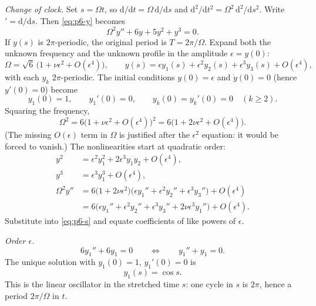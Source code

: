 \documentclass[11pt,a4paper]{article}
\begin{document}
\emph{Change of clock.}
Set \(s=\Omega t\), so \(\mathrm{d}/\mathrm{d}t=\Omega\,\mathrm{d}/\mathrm{d}s\) and \(\mathrm{d}^{2}/\mathrm{d}t^{2}=\Omega^{2}\,\mathrm{d}^{2}/\mathrm{d}s^{2}\). Write \('=\mathrm{d}/\mathrm{d}s\). Then \eqref{eq:p6-y} becomes
\begin{equation}
\label{eq:p6-s}
\Omega^{2} y''+6y+5y^{2}+y^{3}=0.
\end{equation}
If \(y(s)\) is \(2\pi\)-periodic, the original period is \(T=2\pi/\Omega\). Expand both the unknown frequency and the unknown profile in the amplitude \(\epsilon=y(0)\):
\begin{equation}
\label{eq:p6-ansatz}
\Omega=\sqrt{6}\,\bigl(1+\nu\epsilon^{2}+O(\epsilon^{4})\bigr),
\qquad
y(s)=\epsilon y_{1}(s)+\epsilon^{2} y_{2}(s)+\epsilon^{3} y_{3}(s)+O(\epsilon^{4}),
\end{equation}
with each \(y_{k}\) \(2\pi\)-periodic. The initial conditions \(y(0)=\epsilon\) and \(\dot y(0)=0\) (hence \(y'(0)=0\)) become
\[
y_{1}(0)=1,\qquad y_{1}'(0)=0,
\qquad
y_{k}(0)=y_{k}'(0)=0\quad(k\ge 2).
\]
Squaring the frequency,
\[
\Omega^{2}
=
6\bigl(1+\nu\epsilon^{2}+O(\epsilon^{4})\bigr)^{2}
=
6\bigl(1+2\nu\epsilon^{2}+O(\epsilon^{4})\bigr).
\]
(The missing \(O(\epsilon)\) term in \(\Omega\) is justified after the \(\epsilon^{2}\) equation: it would be forced to vanish.) The nonlinearities start at quadratic order:
\begin{align*}
y^{2}
&=
\epsilon^{2} y_{1}^{2}+2\epsilon^{3} y_{1}y_{2}+O(\epsilon^{4}),
\\
y^{3}
&=
\epsilon^{3} y_{1}^{3}+O(\epsilon^{4}),
\\
\Omega^{2} y''
&=
6\bigl(1+2\nu\epsilon^{2}\bigr)\bigl(\epsilon y_{1}''+\epsilon^{2} y_{2}''+\epsilon^{3} y_{3}''\bigr)+O(\epsilon^{4})
\\
&=
6\bigl(\epsilon y_{1}''+\epsilon^{2} y_{2}''+\epsilon^{3} y_{3}''+2\nu\epsilon^{3} y_{1}''\bigr)+O(\epsilon^{4}).
\end{align*}
Substitute into \eqref{eq:p6-s} and equate coefficients of like powers of \(\epsilon\).

\emph{Order \(\epsilon\).}
\[
6y_{1}''+6y_{1}=0
\qquad\Longleftrightarrow\qquad
y_{1}''+y_{1}=0.
\]
The unique solution with \(y_{1}(0)=1\), \(y_{1}'(0)=0\) is
\[
y_{1}(s)=\cos s.
\]
This is the linear oscillator in the stretched time \(s\): one cycle in \(s\) is \(2\pi\), hence a period \(2\pi/\Omega\) in \(t\).
\end{document}

